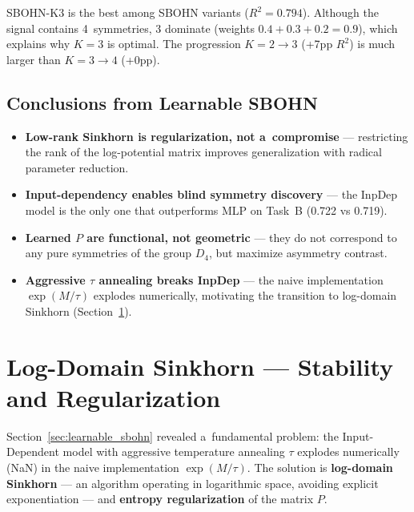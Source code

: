 \documentclass[11pt,a4paper]{report}
\begin{document}
SBOHN-K3 is the best among SBOHN variants ($R^2=0.794$). Although the signal contains 4~symmetries, 3 dominate (weights $0.4+0.3+0.2=0.9$), which explains why $K=3$ is optimal. The progression $K=2 \to 3$ (+7pp $R^2$) is much larger than $K=3 \to 4$ (+0pp).


\subsection{Conclusions from Learnable SBOHN}

\begin{itemize}
    \item \textbf{Low-rank Sinkhorn is regularization, not a~compromise} --- restricting the rank of the log-potential matrix improves generalization with radical parameter reduction.
    \item \textbf{Input-dependency enables blind symmetry discovery} --- the InpDep model is the only one that outperforms MLP on Task~B (0.722 vs 0.719).
    \item \textbf{Learned $P$ are functional, not geometric} --- they do not correspond to any pure symmetries of the group $D_4$, but maximize asymmetry contrast.
    \item \textbf{Aggressive $\tau$ annealing breaks InpDep} --- the naive implementation $\exp(M/\tau)$ explodes numerically, motivating the transition to log-domain Sinkhorn (Section~\ref{sec:logdomain}).
\end{itemize}




\section{Log-Domain Sinkhorn --- Stability and Regularization}\label{sec:logdomain}

Section~\ref{sec:learnable_sbohn} revealed a~fundamental problem: the Input-Dependent model with aggressive temperature annealing $\tau$ explodes numerically (NaN) in the naive implementation $\exp(M/\tau)$.
The solution is \textbf{log-domain Sinkhorn} --- an algorithm operating in logarithmic space, avoiding explicit exponentiation --- and \textbf{entropy regularization} of the matrix $P$.
\end{document}
